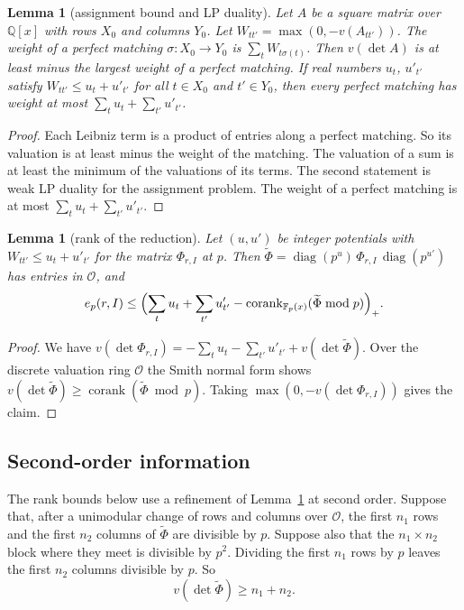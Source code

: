 \documentclass[11pt]{amsart}
\newtheorem{lemma}[theorem]{Lemma}
\theoremstyle{definition}
\theoremstyle{remark}
\numberwithin{equation}{section}
\newcommand{\Q}{\mathbb Q}
\newcommand{\F}{\mathbb F}
\newcommand{\corank}{\operatorname{corank}}
\newcommand{\cO}{\mathcal O}
\begin{document}
\begin{lemma}[assignment bound and LP duality]\label{lem:trop}
Let $A$ be a square matrix over $\Q[x]$ with rows $X_0$ and columns $Y_0$. Let $W_{tt'}=\max(0,-v(A_{tt'}))$. The weight
of a perfect matching $\sigma\colon X_0\to Y_0$ is $\sum_tW_{t\sigma(t)}$. Then $v(\det A)$ is at least minus the
largest weight of a perfect matching. If real numbers $u_t$, $u'_{t'}$ satisfy $W_{tt'}\le u_t+u'_{t'}$ for all
$t\in X_0$ and $t'\in Y_0$, then every perfect matching has weight at most $\sum_tu_t+\sum_{t'}u'_{t'}$.
\end{lemma}
\begin{proof}
Each Leibniz term is a product of entries along a perfect matching. So its valuation is at least minus the weight of the
matching. The valuation of a sum is at least the minimum of the valuations of its terms. The second statement is weak
LP duality for the assignment problem. The weight of a perfect matching is at most $\sum_tu_t+\sum_{t'}u'_{t'}$.
\end{proof}

\begin{lemma}[rank of the reduction]\label{lem:rank}
Let $(u,u')$ be integer potentials with $W_{tt'}\le u_t+u'_{t'}$ for the matrix $\Phi_{r,I}$ at $p$. Then $\widetilde\Phi=\operatorname{diag}(p^{u})\,\Phi_{r,I}\,
\operatorname{diag}(p^{u'})$ has entries in $\cO$, and
\[
 e_p(r,I)\le\Bigl(\sum_tu_t+\sum_{t'}u'_{t'}-\corank_{\F_p(x)}(\widetilde\Phi\bmod p)\Bigr)_+.
\]
\end{lemma}
\begin{proof}
We have $v(\det\Phi_{r,I})=-\sum_tu_t-\sum_{t'}u'_{t'}+v(\det\widetilde\Phi)$. Over the discrete valuation ring $\cO$ the Smith normal form
shows $v(\det\widetilde\Phi)\ge\corank(\widetilde\Phi\bmod p)$.
Taking $\max(0,-v(\det\Phi_{r,I}))$ gives the claim.
\end{proof}

\subsection{Second-order information}\label{ssec:second}
The rank bounds below use a refinement of Lemma~\ref{lem:rank} at second order. Suppose that, after a unimodular change
of rows and columns over $\cO$, the first $n_1$ rows and the first $n_2$ columns of $\widetilde\Phi$ are divisible by
$p$. Suppose also that the $n_1\times n_2$ block where they meet is divisible by $p^2$. Dividing the first $n_1$ rows by
$p$ leaves the first $n_2$ columns divisible by $p$. So
\begin{equation}\label{eq:corner}
 v(\det\widetilde\Phi)\ge n_1+n_2 .
\end{equation}
\end{document}
